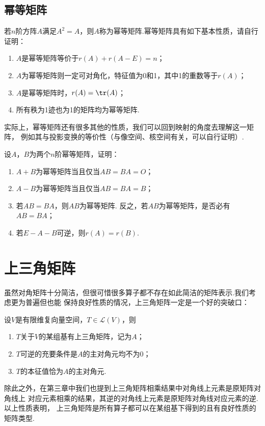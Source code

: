 \subsection{幂等矩阵}
若$n$阶方阵$A$满足$A^2=A$，则$A$称为幂等矩阵.幂等矩阵具有如下基本性质，请自行证明：
\begin{enumerate}
    \item $A$是幂等矩阵等价于$r(A)+r(A-E)=n$；

    \item $A$为幂等矩阵则一定可对角化，特征值为0和1，其中1的重数等于$r(A)$；

    \item $A$是幂等矩阵时，$r(A)=\tr(A)$；

    \item 所有秩为1迹也为1的矩阵均为幂等矩阵.
\end{enumerate}
实际上，幂等矩阵还有很多其他的性质，我们可以回到映射的角度去理解这一矩阵，
例如其与投影变换的等价性（与像空间、核空间有关，可以自行证明）.
\begin{example}
    设$A$，$B$为两个$n$阶幂等矩阵，证明：
    \begin{enumerate}
        \item $A+B$为幂等矩阵当且仅当$AB=BA=O$；

        \item $A-B$为幂等矩阵当且仅当$AB=BA=B$；

        \item 若$AB=BA$，则$AB$为幂等矩阵. 反之，若$AB$为幂等矩阵，是否必有$AB=BA$；

        \item 若$E-A-B$可逆，则$r(A)=r(B)$.
    \end{enumerate}
\end{example}

\section{上三角矩阵}

虽然对角矩阵十分简洁，但很可惜很多算子都不存在如此简洁的矩阵表示.我们考虑更为普遍但也能
保持良好性质的情况，上三角矩阵一定是一个好的突破口：
\begin{theorem}\label{th:16:upper-tri}
    设$V$是有限维复向量空间，$T\in \mathcal{L}(V)$，则
    \begin{enumerate}
        \item $T$关于$V$的某组基有上三角矩阵，记为$A$；

        \item $T$可逆的充要条件是$A$的主对角元均不为0；

        \item $T$的本征值恰为$A$的主对角元.
    \end{enumerate}
\end{theorem}
除此之外，在第三章中我们也提到上三角矩阵相乘结果中对角线上元素是原矩阵对角线上
对应元素相乘的结果，其逆的对角线上元素是原矩阵对角线对应元素的逆.以上性质表明，
上三角矩阵是所有算子都可以在某组基下得到的且有良好性质的矩阵类型.

